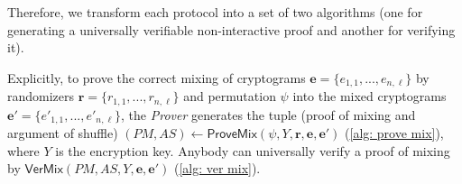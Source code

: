 Therefore, we transform each protocol into a set of two algorithms (one for generating a universally verifiable non-interactive proof and another for verifying it).

Explicitly, to prove the correct mixing of cryptograms $\boldsymbol{e} = \{e_{1,1}, ..., e_{n,\ell}\}$ by randomizers $\boldsymbol{r} = \{r_{1,1}, ..., r_{n,\ell}\}$ and permutation $\psi$ into the mixed cryptograms $\boldsymbol{e'} = \{e'_{1,1}, ..., e'_{n,\ell}\}$, the \textit{Prover} generates the tuple (proof of mixing and argument of shuffle) $(PM, AS) \gets \mathsf{ProveMix}(\psi, Y, \boldsymbol{r}, \boldsymbol{e}, \boldsymbol{e'})$ (\cref{alg: prove mix}), where $Y$ is the encryption key. Anybody can universally verify a proof of mixing by $\mathsf{VerMix}(PM, AS, Y, \boldsymbol{e}, \boldsymbol{e'})$ (\cref{alg: ver mix}).

